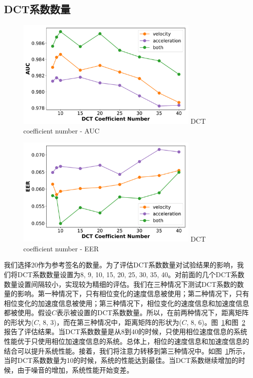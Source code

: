 \subsection{DCT系数数量}
\begin{figure}
  \centering
  \includegraphics[width=0.8\textwidth]{figure/dct_total_auc.pdf}
      {DCT coefficient number - AUC}
  \label{fig:dct-total-auc}
\end{figure}
\begin{figure}
  \centering
  \includegraphics[width=0.8\textwidth]{figure/dct_total_eer.pdf}
      {DCT coefficient number - EER}
  \label{fig:dct-total-eer}
\end{figure}
我们选择20作为参考签名的数量。为了评估DCT系数数量对试验结果的影响，我们将DCT系数数量设置为8, 9, 10, 15, 20, 25, 30, 35, 40。对前面的几个DCT系数数量设置间隔较小，实现较为精细的评估。我们在三种情况下测试DCT系数的数量的影响。第一种情况下，只有相位变化的速度信息被使用；第二种情况下，只有相位变化的加速度信息被使用；第三种情况下，相位变化的速度信息和加速度信息都被使用。假设$C$表示被设置的DCT系数数量。所以，在前两种情况下，距离矩阵的形状为($C$, 8, 3)，而在第三种情况中，距离矩阵的形状为($C$, 8, 6)。图~\ref{fig:dct-total-auc}和图~\ref{fig:dct-total-eer}报告了评估结果。当DCT系数数量是从8到40的时候，只使用相位速度信息的系统性能优于只使用相位加速度信息的系统。总体上，相位的速度信息和加速度信息的结合可以提升系统性能。接着，我们将注意力转移到第三种情况中。如图~\ref{fig:dct-total-auc}所示，当时DCT系数数量为10的时候，系统的性能达到最佳。当DCT系数继续增加的时候，由于噪音的增加，系统性能开始变差。

